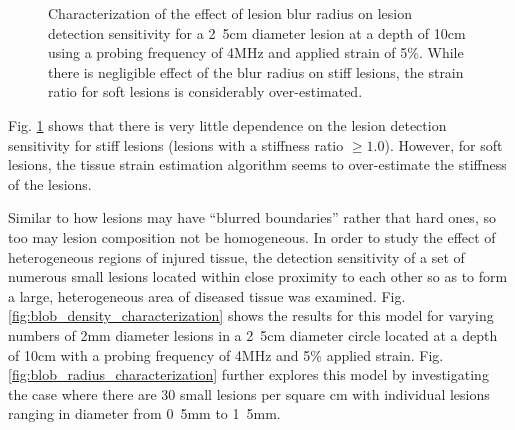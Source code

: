 			\begin{figure}[!t]
				\centering
				\caption{Characterization of the effect of lesion blur radius on lesion detection sensitivity for a \unit{2.5}{cm} diameter lesion at a depth of \unit{10}{cm} using a probing frequency of \unit{4}{MHz} and applied strain of \unit{5}{\%}. While there is negligible effect of the blur radius on stiff lesions, the strain ratio for soft lesions is considerably over-estimated.}
				\label{fig:blur_radius_characterization}
			\end{figure}

			Fig. \ref{fig:blur_radius_characterization} shows that there is very little dependence on the lesion detection sensitivity for stiff lesions (lesions with a stiffness ratio $\geq 1.0$). However, for soft lesions, the tissue strain estimation algorithm seems to over-estimate the stiffness of the lesions.


			Similar to how lesions may have ``blurred boundaries'' rather that hard ones, so too may lesion composition not be homogeneous. In order to study the effect of heterogeneous regions of injured tissue, the detection sensitivity of a set of numerous small lesions located within close proximity to each other so as to form a large, heterogeneous area of diseased tissue was examined. Fig. \ref{fig:blob_density_characterization} shows the results for this model for varying numbers of \unit{2}{mm} diameter lesions in a \unit{2.5}{cm} diameter circle located at a depth of \unit{10}{cm} with a probing frequency of \unit{4}{MHz} and \unit{5}{\%} applied strain. Fig. \ref{fig:blob_radius_characterization} further explores this model by investigating the case where there are 30 small lesions per square \unit{}{cm} with individual lesions ranging in diameter from \unit{0.5}{mm} to \unit{1.5}{mm}.

